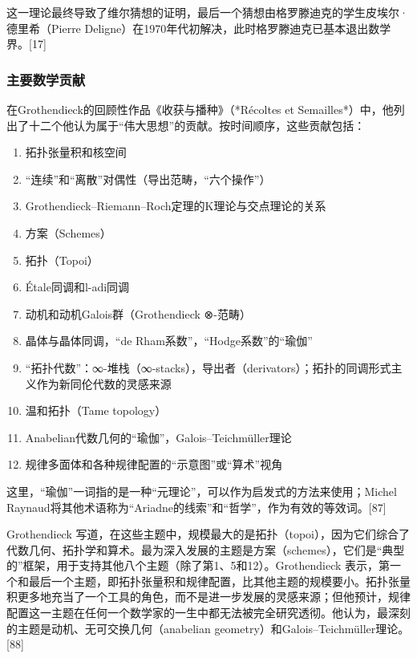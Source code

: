 这一理论最终导致了维尔猜想的证明，最后一个猜想由格罗滕迪克的学生皮埃尔·德里希（Pierre Deligne）在1970年代初解决，此时格罗滕迪克已基本退出数学界。[17]
\subsubsection{主要数学贡献}
在Grothendieck的回顾性作品《收获与播种》（*Récoltes et Semailles*）中，他列出了十二个他认为属于“伟大思想”的贡献。按时间顺序，这些贡献包括：
\begin{enumerate}
\item 拓扑张量积和核空间
\item “连续”和“离散”对偶性（导出范畴，“六个操作”）
\item Grothendieck–Riemann–Roch定理的K理论与交点理论的关系
\item 方案（Schemes）
\item 拓扑（Topoi）
\item Étale同调和l-adi同调
\item 动机和动机Galois群（Grothendieck ⊗-范畴）
\item 晶体与晶体同调，“de Rham系数”，“Hodge系数”的“瑜伽”
\item “拓扑代数”：∞-堆栈（∞-stacks），导出者（derivators）；拓扑的同调形式主义作为新同伦代数的灵感来源
\item 温和拓扑（Tame topology）
\item Anabelian代数几何的“瑜伽”，Galois–Teichmüller理论
\item 规律多面体和各种规律配置的“示意图”或“算术”视角
\end{enumerate}
这里，“瑜伽”一词指的是一种“元理论”，可以作为启发式的方法来使用；Michel Raynaud将其他术语称为“Ariadne的线索”和“哲学”，作为有效的等效词。[87]

Grothendieck 写道，在这些主题中，规模最大的是拓扑（topoi），因为它们综合了代数几何、拓扑学和算术。最为深入发展的主题是方案（schemes），它们是“典型的”框架，用于支持其他八个主题（除了第1、5和12）。Grothendieck 表示，第一个和最后一个主题，即拓扑张量积和规律配置，比其他主题的规模要小。拓扑张量积更多地充当了一个工具的角色，而不是进一步发展的灵感来源；但他预计，规律配置这一主题在任何一个数学家的一生中都无法被完全研究透彻。他认为，最深刻的主题是动机、无可交换几何（anabelian geometry）和Galois–Teichmüller理论。[88]